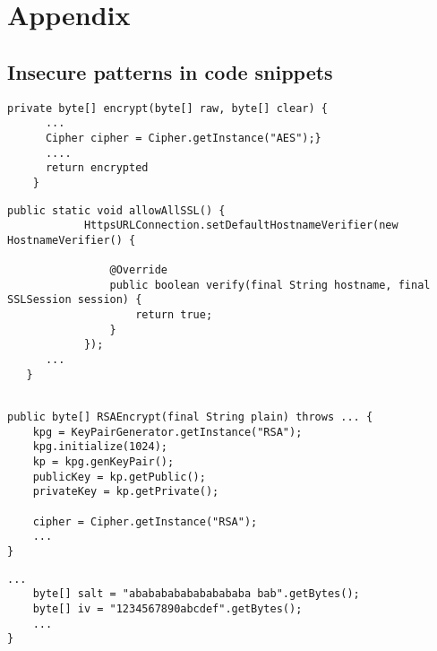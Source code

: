 \section{Appendix}
\label{sec:appendix}
\subsection{Insecure patterns in code snippets}

\begin{lstlisting}[caption={A code snippet showing insecure use of AES default encryption mode ECB.}, label={fig:aes-encryption-example}]
    private byte[] encrypt(byte[] raw, byte[] clear) {
      ...
      Cipher cipher = Cipher.getInstance("AES");}
      ....
      return encrypted
    }
     \end{lstlisting}

\begin{lstlisting}[caption={A code snippet showing insecure use of Absence of performing hostname verification.}, 
label={listing:Absence-of-performing-hostname-verification}]
   public static void allowAllSSL() {
            HttpsURLConnection.setDefaultHostnameVerifier(new HostnameVerifier() {

                @Override
                public boolean verify(final String hostname, final SSLSession session) {
                    return true;
                }
            });
      ...
   }
\end{lstlisting}

\begin{lstlisting}[caption={A code snippet showing insecure use of weak key length.}, 
label={listing:Weak-key-length}]

public byte[] RSAEncrypt(final String plain) throws ... {
    kpg = KeyPairGenerator.getInstance("RSA");
    kpg.initialize(1024);
    kp = kpg.genKeyPair();
    publicKey = kp.getPublic();
    privateKey = kp.getPrivate();

    cipher = Cipher.getInstance("RSA");
    ... 
}
\end{lstlisting}

\begin{lstlisting}[caption={A code snippet showing insecure use of static predictable IV.}, 
label={listing:Static-constant-predictable-keys-IV}]
    ...
    byte[] salt = "abababababababababa bab".getBytes();
    byte[] iv = "1234567890abcdef".getBytes();
    ... 
}
\end{lstlisting}

